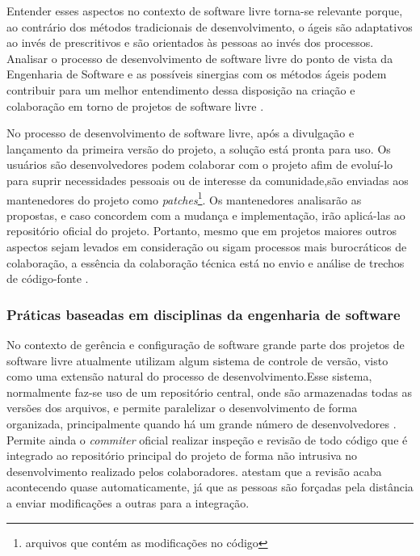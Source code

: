 Entender esses aspectos no contexto de software livre torna-se relevante porque, ao contrário dos métodos tradicionais de desenvolvimento, o ágeis são adaptativos ao invés de prescritivos e são orientados às pessoas ao invés dos processos. Analisar o processo de desenvolvimento de software livre do ponto de vista da Engenharia de Software e as possíveis sinergias com os métodos ágeis podem contribuir para um melhor entendimento dessa disposição na criação e colaboração em torno de projetos de software livre \cite{meirelles2013}.

No processo de desenvolvimento de software livre, após a divulgação e lançamento da primeira versão do projeto, a solução está pronta para uso. Os usuários são desenvolvedores podem colaborar com o projeto afim de evoluí-lo para suprir necessidades pessoais ou de interesse da comunidade,são enviadas aos mantenedores do projeto como \textit{patches}\footnote{arquivos que contém as modificações no código}. Os mantenedores analisarão as propostas, e caso concordem com a mudança e implementação, irão aplicá-las ao repositório oficial do projeto. Portanto, mesmo que em projetos maiores outros aspectos sejam levados em consideração ou sigam processos mais burocráticos de colaboração, a essência da colaboração técnica está no envio e análise de trechos de código-fonte \cite{meirelles2013}.

\subsubsection{Práticas baseadas em disciplinas da engenharia de software}


No contexto de gerência e configuração de software grande parte dos projetos de software livre atualmente utilizam algum sistema de controle de versão, visto como uma extensão natural do processo de desenvolvimento.Esse sistema, normalmente faz-se uso de um repositório central, onde são armazenadas todas as versões dos arquivos, e permite paralelizar o desenvolvimento de forma organizada, principalmente quando há um grande número de desenvolvedores \cite{reis2001caracterizaccao}. Permite ainda o \textit{commiter} oficial realizar inspeção e revisão de todo código que é integrado ao repositório principal do projeto de forma não intrusiva no desenvolvimento realizado pelos colaboradores.  atestam que a revisão acaba acontecendo quase automaticamente, já que as pessoas são forçadas pela distância a enviar modificações a outras para a integração.

